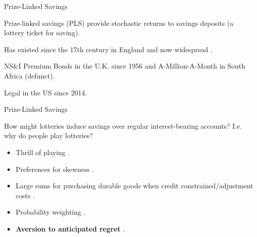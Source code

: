 \documentclass[aspectratio=169]{beamer}
\newenvironment{wideitemize}{\itemize\addtolength{\itemsep}{10pt}}{\enditemize}
\begin{document}
\begin{frame}{Prize-Linked Savings}
	
	\begin{wideitemize}
	\item Prize-linked savings (PLS) provide stochastic returns to savings deposits (a lottery ticket for saving).
		\begin{wideitemize}
		\item Has existed since the 17th century in England and now widespread \parencite{kearney_making_2010}.
		\item NS\&I Premium Bonds in the U.K. since 1956 and A-Million-A-Month in South Africa (defunct).
		\item Legal in the US since 2014.
		\end{wideitemize}
	\end{wideitemize}

\end{frame}

\begin{frame}{Prize-Linked Savings}

	How might lotteries induce savings over regular interest-bearing accounts? I.e. why do people play lotteries?

	\begin{itemize}
		\item Thrill of playing \parencite{conlisk_utility_1993}.
		\item Preferences for skewness \parencite{garrett_gamblers_1999}.
		\item Large sums for purchasing durable goods when credit constrained/adjustment costs \parencite{herskowitz_gambling_2016}.
		\item Probability weighting \parencite{kahneman_advances_1992}.
		\item \textbf{Aversion to anticipated regret} \parencite{loomes_regret_1982,bell_risk_1983,zeelenberg_consequences_1996}.
	\end{itemize}

\end{frame}


\end{document}
